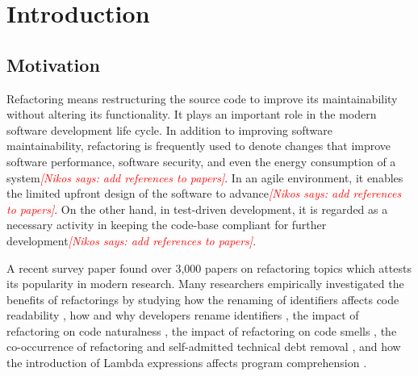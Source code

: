 \documentclass[letterpaper,12pt,onecolumn,final]{report}
\newcommand{\nikos}[1]{\textcolor{red}{{\it [Nikos says: #1]}}}
\begin{document}
\chapter{Introduction}
\section{Motivation}
Refactoring means restructuring the source code to improve its maintainability without altering its functionality. It plays an important role in the modern software development life cycle.
In addition to improving software maintainability, refactoring is frequently used to denote changes that improve software performance, software security, and even the energy consumption of a system\nikos{add references to papers}. In an agile environment, it enables the limited upfront design of the software to advance\nikos{add references to papers}. On the other hand, in test-driven development, it is regarded as a necessary activity in keeping the code-base compliant for further development\nikos{add references to papers}. 

A recent survey paper \cite{abid202030} found over 3,000 papers on refactoring topics which attests its popularity in modern research. Many researchers empirically investigated the benefits of refactorings by studying how the renaming of identifiers affects code readability \cite{fakhoury2019improving}, how and why developers rename identifiers \cite{peruma2018empirical}, the impact of refactoring on code naturalness \cite{lin2019impact}, the impact of refactoring on code smells \cite{cedrim2017understanding}, the co-occurrence of refactoring and self-admitted technical debt removal \cite{iammarino2019self}, and how the introduction of Lambda expressions affects program comprehension \cite{lucas2019does}.
\end{document}
